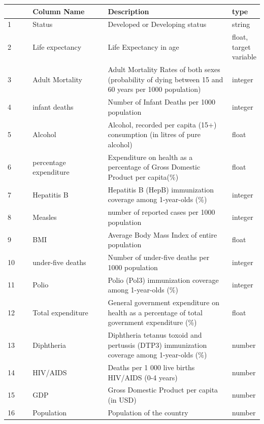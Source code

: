 \begin{table}
  \centering
  \begin{tabular}{@{}p{0.1\linewidth}  p{0.3\linewidth}p{0.5\linewidth}p{0.1\linewidth}@{}}
    \toprule
      & Column Name     & Description                                                             & type \\
    \midrule 
    1 & Status                 & Developed or Developing status                               & string \\
    2 & Life expectancy   & Life Expectancy in age                                             & float, target variable \\
    3 & Adult Mortality    & Adult Mortality Rates of both sexes (probability of dying between 15 and 60 years per 1000 population) & integer \\
    4 & infant deaths      & Number of Infant Deaths per 1000 population & integer \\
    5 & Alcohol              & Alcohol, recorded per capita (15+) consumption (in litres of pure alcohol) & float \\
    6 & percentage expenditure & Expenditure on health as a percentage of Gross Domestic Product per capita(\%) & float \\
    7 & Hepatitis B & Hepatitis B (HepB) immunization coverage among 1-year-olds (\%) & integer \\
    8 & Measles & number of reported cases per 1000 population & integer \\
    9 & BMI & Average Body Mass Index of entire population & float \\
    10 & under-five deaths & Number of under-five deaths per 1000 population & integer \\
    11 & Polio & Polio (Pol3) immunization coverage among 1-year-olds (\%) & integer \\
    12 & Total expenditure & General government expenditure on health as a percentage of total government expenditure (\%) & float \\
    13 & Diphtheria & Diphtheria tetanus toxoid and pertussis (DTP3) immunization coverage among 1-year-olds (\%) & number \\
    14 & HIV/AIDS & Deaths per 1 000 live births HIV/AIDS (0-4 years) & number \\
    15 & GDP & Gross Domestic Product per capita (in USD) & number \\
    16 & Population & Population of the country & number \\

\end{tabular}
\end{table}

